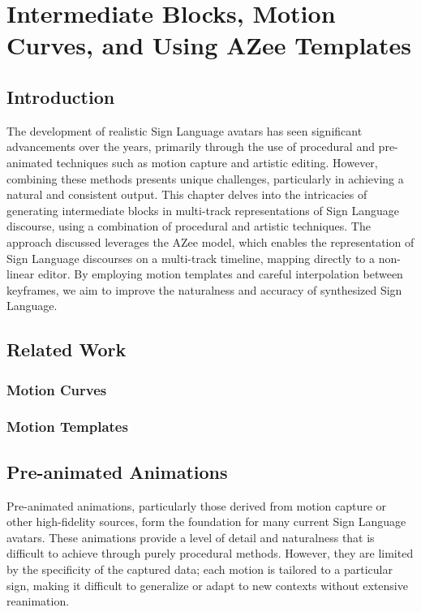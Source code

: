 \documentclass[../../main.tex]{subfiles}
\begin{document}
\chapter{Intermediate Blocks, Motion Curves, and Using AZee Templates}

\section{Introduction}

The development of realistic Sign Language avatars has seen significant advancements over the years, primarily through the use of procedural and pre-animated techniques such as motion capture and artistic editing. However, combining these methods presents unique challenges, particularly in achieving a natural and consistent output. This chapter delves into the intricacies of generating intermediate blocks in multi-track representations of Sign Language discourse, using a combination of procedural and artistic techniques. The approach discussed leverages the AZee model, which enables the representation of Sign Language discourses on a multi-track timeline, mapping directly to a non-linear editor. By employing motion templates and careful interpolation between keyframes, we aim to improve the naturalness and accuracy of synthesized Sign Language.


\section{Related Work}

\subsection{Motion Curves}

\subsection{Motion Templates}

\section{Pre-animated Animations}

Pre-animated animations, particularly those derived from motion capture or other high-fidelity sources, form the foundation for many current Sign Language avatars. These animations provide a level of detail and naturalness that is difficult to achieve through purely procedural methods. However, they are limited by the specificity of the captured data; each motion is tailored to a particular sign, making it difficult to generalize or adapt to new contexts without extensive reanimation.
\end{document}
